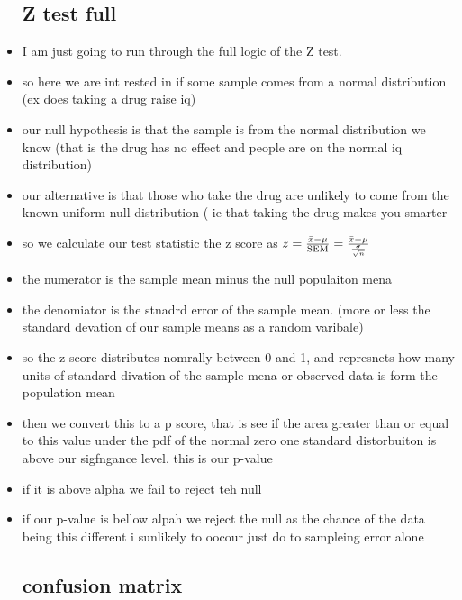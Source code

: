 \documentclass{article}
\begin{document}
\begin{itemize}
\subsection{Z test full}
\item I am just going to run through the full logic of the Z test. 
\item so here we are int rested in if some sample comes from a normal distribution (ex does taking a drug raise iq) 
\item our null hypothesis is that the sample is from the normal distribution we know (that is the drug has no effect and people are on the normal iq distribution)
\item our alternative is that those who take the drug are unlikely to come from the known uniform null distribution ( ie that taking the drug makes you smarter
\item so we calculate our test statistic the z score as $z=\frac{\Bar{x}-\mu}{\text{SEM}}=\frac{\Bar{x}-\mu}{\frac{\sigma}{\sqrt{n}}}$
\item the numerator is the sample mean minus the null populaiton mena 
\item the denomiator is the stnadrd error of the sample mean. (more or less the standard devation of our sample means as a random varibale) 
\item so the z score distributes nomrally between 0 and 1, and represnets how many units of standard divation of the sample mena or observed data is form the population mean 
\item then we convert this to a p score, that is see if the area greater than or equal to this value under the pdf of the normal zero one standard distorbuiton is above our sigfngance level. this is our p-value
\item if it is above alpha we fail to reject teh null
\item if our p-value is bellow alpah we reject the null as the chance of the data being this different i sunlikely to oocour just do to sampleing error alone 
\subsection{confusion matrix }


\end{itemize}
\end{document}
